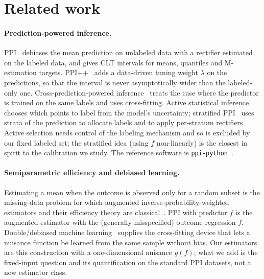 \section{Related work}
\label{sec:related}
\paragraph{Prediction-powered inference.} PPI~\citep{angelopoulos2023ppi} debiases the mean prediction on unlabeled data with a rectifier estimated on the labeled data, and gives CLT intervals for means, quantiles and M-estimation targets. PPI++~\citep{angelopoulos2023ppipp} adds a data-driven tuning weight $\lambda$ on the predictions, so that the interval is never asymptotically wider than the labeled-only one. Cross-prediction-powered inference~\citep{zrnic2023cross} treats the case where the predictor is trained on the same labels and uses cross-fitting. Active statistical inference~\citep{zrnic2024active} chooses which points to label from the model's uncertainty; stratified PPI~\citep{fisch2024stratified} uses strata of the prediction to allocate labels and to apply per-stratum rectifiers. Active selection needs control of the labeling mechanism and so is excluded by our fixed labeled set; the stratified idea (using $f$ non-linearly) is the closest in spirit to the calibration we study. The reference software is \texttt{ppi-python}~\citep{ppipython}.

\paragraph{Semiparametric efficiency and debiased learning.} Estimating a mean when the outcome is observed only for a random subset is the missing-data problem for which augmented inverse-probability-weighted estimators and their efficiency theory are classical~\citep{robins1994aipw,tsiatis2006}. PPI with predictor $f$ is the augmented estimator with the (generally misspecified) outcome regression $f$. Double/debiased machine learning~\citep{chernozhukov2018dml} supplies the cross-fitting device that lets a nuisance function be learned from the same sample without bias. Our estimators are this construction with a one-dimensional nuisance $g(f)$; what we add is the fixed-input question and its quantification on the standard PPI datasets, not a new estimator class.
